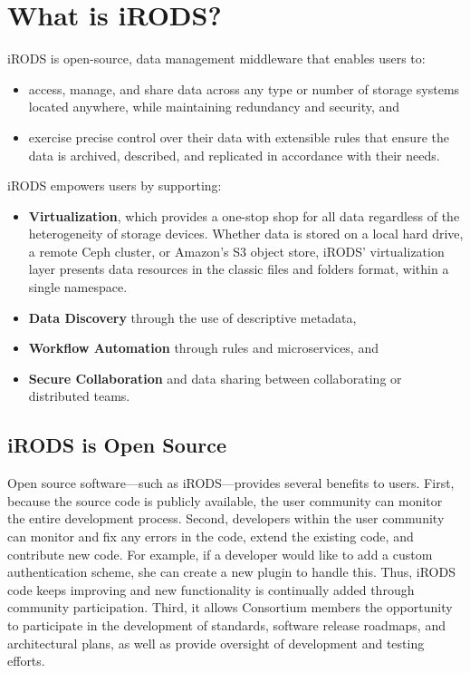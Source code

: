 \documentclass[10pt,oneside]{memoir}
\begin{document}
\chapter{What is iRODS?}

iRODS is open-source, data management middleware that enables users to:

\begin{itemize}
 \item access, manage, and share data across any type or number of storage systems located anywhere, while maintaining redundancy and security, and
 \item exercise precise control over their data with extensible rules that ensure the data is archived, described, and replicated in accordance with their needs.
\end{itemize}

iRODS empowers users by supporting:

\begin{itemize}
 \item \textbf{Virtualization}, which provides a one-stop shop for all data regardless of the heterogeneity of storage devices. Whether data is stored on a local hard drive, a remote Ceph cluster, or Amazon's S3 object store, iRODS' virtualization layer presents data resources in the classic files and folders format, within a single namespace.
 \item \textbf{Data Discovery} through the use of descriptive metadata,
 \item \textbf{Workflow Automation} through rules and microservices, and
 \item \textbf{Secure Collaboration} and data sharing between collaborating or distributed teams.
\end{itemize}

\section{iRODS is Open Source}

Open source software---such as iRODS---provides several benefits to users. First, because the source code is publicly available, the user community can monitor the entire development process. Second, developers within the user community can monitor and fix any errors in the code, extend the existing code, and contribute new code. For example, if a developer would like to add a custom authentication scheme, she can create a new plugin to handle this. Thus, iRODS code keeps improving and new functionality is continually added through community participation. Third, it allows Consortium members the opportunity to participate in the development of standards, software release roadmaps, and architectural plans, as well as provide oversight of development and testing efforts.
\end{document}
